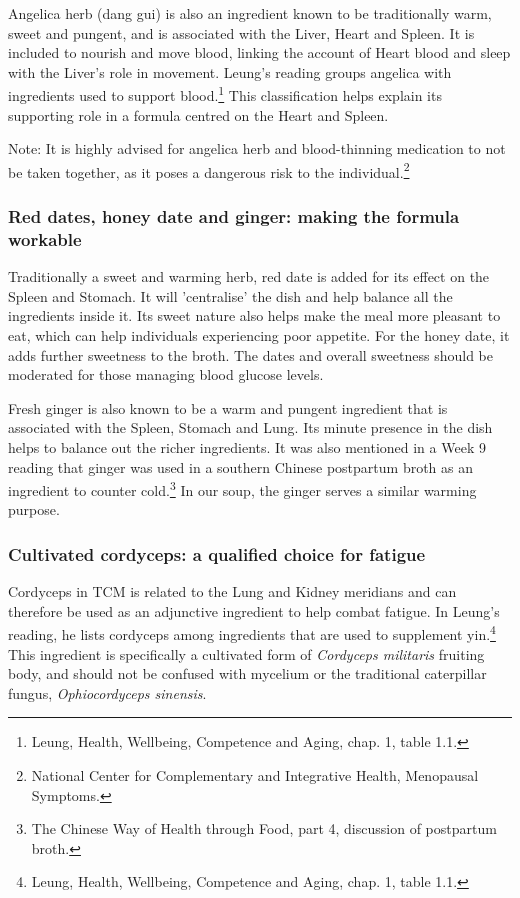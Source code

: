 \documentclass[12pt,a4paper]{article}
\begin{document}
Angelica herb (dang gui) is also an ingredient known to be traditionally warm, sweet and pungent, and is associated with the Liver, Heart and Spleen. It is included to nourish and move blood, linking the account of Heart blood and sleep with the Liver's role in movement. Leung's reading groups angelica with ingredients used to support blood.\footnote{Leung, Health, Wellbeing, Competence and Aging, chap. 1, table 1.1.} This classification helps explain its supporting role in a formula centred on the Heart and Spleen.

Note: It is highly advised for angelica herb and blood-thinning medication to not be taken together, as it poses a dangerous risk to the individual.\footnote{National Center for Complementary and Integrative Health, Menopausal Symptoms.}

\subsubsection*{Red dates, honey date and ginger: making the formula workable}
Traditionally a sweet and warming herb, red date is added for its effect on the Spleen and Stomach. It will 'centralise' the dish and help balance all the ingredients inside it. Its sweet nature also helps make the meal more pleasant to eat, which can help individuals experiencing poor appetite. For the honey date, it adds further sweetness to the broth. The dates and overall sweetness should be moderated for those managing blood glucose levels.

Fresh ginger is also known to be a warm and pungent ingredient that is associated with the Spleen, Stomach and Lung. Its minute presence in the dish helps to balance out the richer ingredients. It was also mentioned in a Week 9 reading that ginger was used in a southern Chinese postpartum broth as an ingredient to counter cold.\footnote{The Chinese Way of Health through Food, part 4, discussion of postpartum broth.} In our soup, the ginger serves a similar warming purpose.

\subsubsection*{Cultivated cordyceps: a qualified choice for fatigue}
Cordyceps in TCM is related to the Lung and Kidney meridians and can therefore be used as an adjunctive ingredient to help combat fatigue. In Leung's reading, he lists cordyceps among ingredients that are used to supplement yin.\footnote{Leung, Health, Wellbeing, Competence and Aging, chap. 1, table 1.1.} This ingredient is specifically a cultivated form of \emph{Cordyceps militaris} fruiting body, and should not be confused with mycelium or the traditional caterpillar fungus, \emph{Ophiocordyceps sinensis}.
\end{document}
